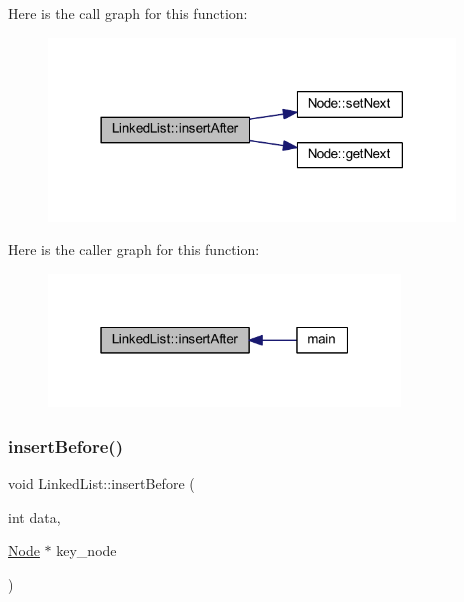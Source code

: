 Here is the call graph for this function\+:
\nopagebreak
\begin{figure}[H]
\begin{center}
\leavevmode
\includegraphics[width=306pt]{class_linked_list_af508f8b52bbcf1485a1552ac8fc84b81_cgraph}
\end{center}
\end{figure}
Here is the caller graph for this function\+:
\nopagebreak
\begin{figure}[H]
\begin{center}
\leavevmode
\includegraphics[width=265pt]{class_linked_list_af508f8b52bbcf1485a1552ac8fc84b81_icgraph}
\end{center}
\end{figure}
\mbox{\label{class_linked_list_a895ad950cc619c9cf72273e5e59a100f}} 
\subsubsection{\texorpdfstring{insert\+Before()}{insertBefore()}}
{\footnotesize\ttfamily void Linked\+List\+::insert\+Before (\begin{DoxyParamCaption}\item[{int}]{data,  }\item[{\hyperlink{class_node}{Node} $\ast$}]{key\+\_\+node }\end{DoxyParamCaption})}

